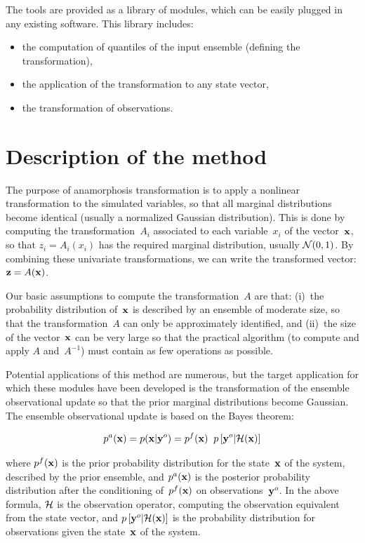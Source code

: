 \documentclass[11pt]{article}
\begin{document}
The tools are provided as a library of modules,
which can be easily plugged in any existing software.
This library includes:

\begin{itemize}
\item the computation of quantiles of the input ensemble (defining the transformation),
\item the application of the transformation to any state vector,
\item the transformation of observations.
\end{itemize}

\clearpage

\pagestyle{plain}

\section{Description of the method}

The purpose of anamorphosis transformation is
to apply a nonlinear transformation to the simulated variables,
so that all marginal distributions become identical
(usually a normalized Gaussian distribution).
This is done by computing the transformation~$A_i$
associated to each variable~$x_i$ of the vector~${\bf x}$,
so that $z_i=A_i(x_i)$ has the required marginal distribution,
usually ${\cal N}(0,1)$.
By combining these univariate transformations,
we can write the transformed vector: ${\bf z} = A({\bf x})$.

Our basic assumptions to compute the transformation~$A$
are that: (i)~the probability distribution of~${\bf x}$
is described by an ensemble of moderate size,
so that the transformation~$A$ can only be approximately identified, and
(ii)~the size of the vector~${\bf x}$ can be very large
so that the practical algorithm (to compute and apply $A$ and~$A^{-1}$)
must contain as few operations as possible.

Potential applications of this method are numerous,
but the target application for which these modules have been developed
is the transformation of the ensemble observational update
so that the prior marginal distributions become Gaussian.
The ensemble observational update is based on the Bayes theorem:

\begin{equation}
p^a({\bf x}) = p({\bf x}|{\bf y}^o) = p^f({\bf x}) \;\; p \left[ {\bf y}^o | {\cal H} ({\bf x}) \right]
\end{equation}

\noindent
where $p^f({\bf x})$ is the prior probability distribution for the state~${\bf x}$ of the system,
described by the prior ensemble, and $p^a({\bf x})$ is the posterior probability distribution
after the conditioning of~$p^f({\bf x})$ on observations~${\bf y}^o$.
In the above formula, ${\cal H}$ is the observation operator, computing the observation
equivalent from the state vector, and $p \left[ {\bf y}^o | {\cal H} ({\bf x}) \right]$
is the probability distribution for observations given the state~${\bf x}$ of the system.
\end{document}
